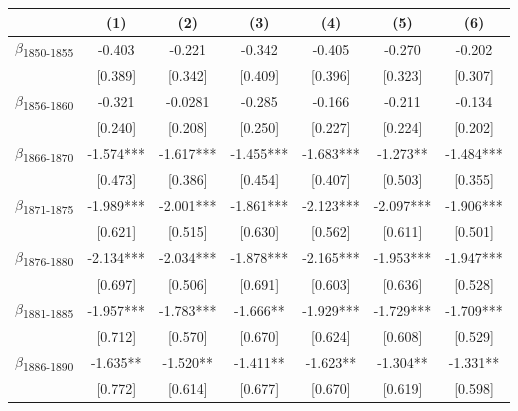 {
\def\sym#1{\ifmmode^{#1}\else\(^{#1}\)\fi}
\begin{tabular}{l*{6}{c}}
\toprule
            &\multicolumn{1}{c}{(1)}   &\multicolumn{1}{c}{(2)}   &\multicolumn{1}{c}{(3)}   &\multicolumn{1}{c}{(4)}   &\multicolumn{1}{c}{(5)}   &\multicolumn{1}{c}{(6)}   \\
\midrule
$\beta$\textsubscript{1850-1855}&      -0.403   &      -0.221   &      -0.342   &      -0.405   &      -0.270   &      -0.202   \\
            &     [0.389]   &     [0.342]   &     [0.409]   &     [0.396]   &     [0.323]   &     [0.307]   \\
$\beta$\textsubscript{1856-1860}&      -0.321   &     -0.0281   &      -0.285   &      -0.166   &      -0.211   &      -0.134   \\
            &     [0.240]   &     [0.208]   &     [0.250]   &     [0.227]   &     [0.224]   &     [0.202]   \\
$\beta$\textsubscript{1866-1870}&      -1.574***&      -1.617***&      -1.455***&      -1.683***&      -1.273** &      -1.484***\\
            &     [0.473]   &     [0.386]   &     [0.454]   &     [0.407]   &     [0.503]   &     [0.355]   \\
$\beta$\textsubscript{1871-1875}&      -1.989***&      -2.001***&      -1.861***&      -2.123***&      -2.097***&      -1.906***\\
            &     [0.621]   &     [0.515]   &     [0.630]   &     [0.562]   &     [0.611]   &     [0.501]   \\
$\beta$\textsubscript{1876-1880}&      -2.134***&      -2.034***&      -1.878***&      -2.165***&      -1.953***&      -1.947***\\
            &     [0.697]   &     [0.506]   &     [0.691]   &     [0.603]   &     [0.636]   &     [0.528]   \\
$\beta$\textsubscript{1881-1885}&      -1.957***&      -1.783***&      -1.666** &      -1.929***&      -1.729***&      -1.709***\\
            &     [0.712]   &     [0.570]   &     [0.670]   &     [0.624]   &     [0.608]   &     [0.529]   \\
$\beta$\textsubscript{1886-1890}&      -1.635** &      -1.520** &      -1.411** &      -1.623** &      -1.304** &      -1.331** \\
            &     [0.772]   &     [0.614]   &     [0.677]   &     [0.670]   &     [0.619]   &     [0.598]   \\

\end{tabular}}
